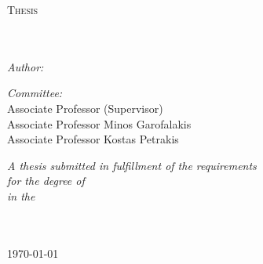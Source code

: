 \documentclass[
12pt, %
english, %
onehalfspacing, %
headsepline, %
oneside,
]{MastersDoctoralThesis} %
\author{Stefanos Stathatos} %
\begin{document}

\pagestyle{plain} %




\begin{titlepage}
\begin{center}

\vspace*{.06\textheight}
{\scshape\LARGE \univname\par}\vspace{1.5cm} %
\textsc{\Large Thesis}\\[0.5cm] %

\HRule \\[0.4cm] %
{\huge \bfseries \ttitle\par}\vspace{0.4cm} %
\HRule \\[1.5cm] %
 
\emph{Author:}\\
{\authorname} %
\vspace{20pt}

\emph{Committee:} \\
{Associate Professor} {\supname} (Supervisor)\\
{Associate Professor} Minos Garofalakis\\
{Associate Professor} Kostas Petrakis\\
\vspace{20pt}
\vfill

\large \textit{A thesis submitted in fulfillment of the requirements\\ for the degree of \degreename}\\[0.3cm] %
\textit{in the}\\[0.4cm]
\deptname\\\univname\\[2cm] %
 
\vfill

{\large \today}\\[4cm] %
 
\vfill
\end{center}
\end{titlepage}
\end{document}
